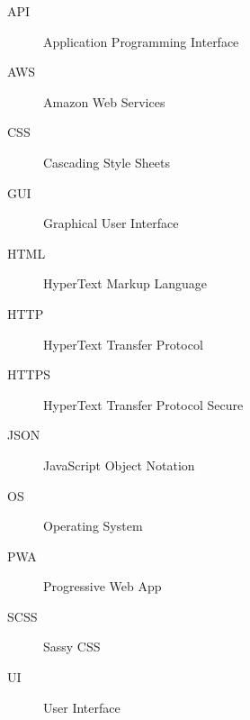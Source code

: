 \begin{description}
    \item[API]   Application Programming Interface
    \item[AWS]   Amazon Web Services
    \item[CSS]   Cascading Style Sheets
    \item[GUI]   Graphical User Interface
    \item[HTML]  HyperText Markup Language
    \item[HTTP]  HyperText Transfer Protocol
    \item[HTTPS] HyperText Transfer Protocol Secure
    \item[JSON]  JavaScript Object Notation
    \item[OS]    Operating System
    \item[PWA]   Progressive Web App
    \item[SCSS]  Sassy CSS
    \item[UI]    User Interface
\end{description}
